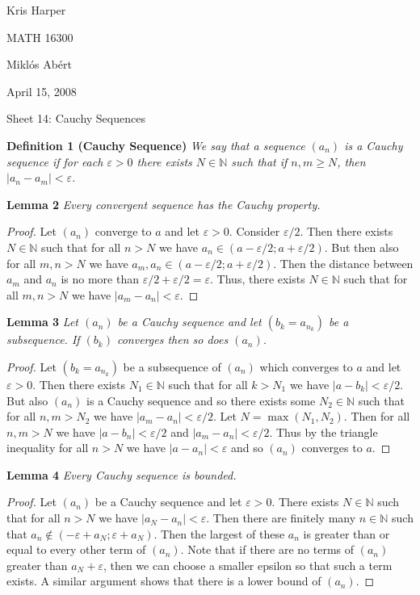 \documentclass{article}
\begin{document}
\begin{flushright}
Kris Harper

MATH 16300

Mikl\'{o}s Ab\'{e}rt

April 15, 2008
\end{flushright}

\begin{flushleft}

\Large

Sheet 14: Cauchy Sequences\newline

\normalsize

\textbf{Definition 1 (Cauchy Sequence)}
\textsl{We say that a sequence $(a_n)$ is a Cauchy sequence if for each $\varepsilon > 0$ there exists $N \in \mathbb{N}$ such that if $n,m \geq N$, then $|a_n-a_m| < \varepsilon$.}\newline

\textbf{Lemma 2}
\textsl{Every convergent sequence has the Cauchy property.}
\begin{proof}
Let $(a_n)$ converge to $a$ and let $\varepsilon > 0$. Consider $\varepsilon/2$. Then there exists $N \in \mathbb{N}$ such that for all $n>N$ we have $a_n \in (a - \varepsilon/2 ; a + \varepsilon/2)$. But then also for all $m,n > N$ we have $a_m, a_n \in (a - \varepsilon/2 ; a + \varepsilon/2)$. Then the distance between $a_m$ and $a_n$ is no more than $\varepsilon / 2 + \varepsilon /2 = \varepsilon$. Thus, there exists $N \in \mathbb{N}$ such that for all $m,n > N$ we have $|a_m-a_n| < \varepsilon$.
\end{proof}

\textbf{Lemma 3}
\textsl{Let $(a_n)$ be a Cauchy sequence and let $(b_k = a_{n_k})$ be a subsequence. If $(b_k)$ converges then so does $(a_n)$.}
\begin{proof}
Let $(b_k = a_{n_k})$ be a subsequence of $(a_n)$ which converges to $a$ and let $\varepsilon > 0$. Then there exists $N_1 \in \mathbb{N}$ such that for all $k > N_1$ we have $|a-b_k| < \varepsilon/2$. But also $(a_n)$ is a Cauchy sequence and so there exists some $N_2 \in \mathbb{N}$ such that for all $n,m > N_2$ we have $|a_m - a_n| < \varepsilon/2$. Let $N = \max (N_1,N_2)$. Then for all $n,m > N$ we have $|a-b_n| < \varepsilon/2$ and $|a_m - a_n| < \varepsilon/2$. Thus by the triangle inequality for all $n>N$ we have $|a - a_n| < \varepsilon$ and so $(a_n)$ converges to $a$.
\end{proof}

\textbf{Lemma 4}
\textsl{Every Cauchy sequence is bounded.}
\begin{proof}
Let $(a_n)$ be a Cauchy sequence and let $\varepsilon > 0$. There exists $N \in \mathbb{N}$ such that for all $n > N$ we have $|a_N - a_n| < \varepsilon$. Then there are finitely many $n \in \mathbb{N}$ such that $a_n \notin (-\varepsilon + a_N ; \varepsilon + a_N)$. Then the largest of these $a_n$ is greater than or equal to every other term of $(a_n)$. Note that if there are no terms of $(a_n)$ greater than $a_N + \varepsilon$, then we can choose a smaller epsilon so that such a term exists. A similar argument shows that there is a lower bound of $(a_n)$.
\end{proof}


\end{flushleft}
\end{document}
